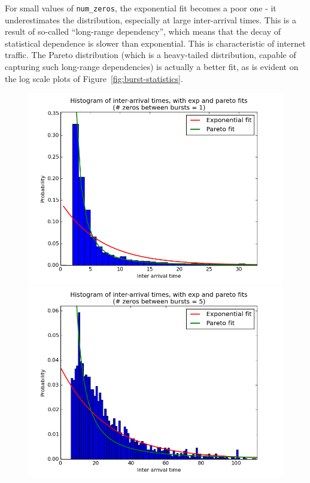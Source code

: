 \documentclass[11pt, twoside]{article}
\begin{document}
For small values of \verb+num_zeros+, the exponential fit becomes a poor one - it underestimates the distribution, especially at large inter-arrival times. This is a result of so-called ``long-range dependency'', which means that the decay of statistical dependence is slower than exponential. This is characteristic of internet traffic. The Pareto distribution (which is a heavy-tailed distribution, capable of capturing such long-range dependencies) is actually a better fit, as is evident on the log scale plots of Figure~\ref{fig:burst-statistics}.
\begin{figure}[h!]
	\centering
	\includegraphics[scale = 0.35]{ipt-1}
	\includegraphics[scale = 0.35]{ipt-5}

\end{figure}
\end{document}
